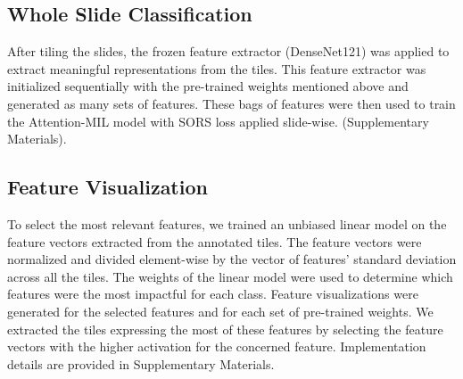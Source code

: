 \subsection{Whole Slide Classification}
After tiling the slides, the frozen feature extractor (DenseNet121) was applied to extract meaningful representations from the tiles. This feature extractor was initialized sequentially with the pre-trained weights mentioned above and generated as many sets of features. These bags of features were then used to train the Attention-MIL model with SORS loss applied slide-wise. (Supplementary Materials).

\subsection{Feature Visualization}
To select the most relevant features, we trained an unbiased linear model on the feature vectors extracted from the annotated tiles. The feature vectors were normalized and divided element-wise by the vector of features’ standard deviation across all the tiles. The weights of the linear model were used to determine which features were the most impactful for each class. Feature visualizations were generated for the selected features and for each set of pre-trained weights. We extracted the tiles expressing the most of these features by selecting the feature vectors with the higher activation for the concerned feature. Implementation details are provided in Supplementary Materials. 


